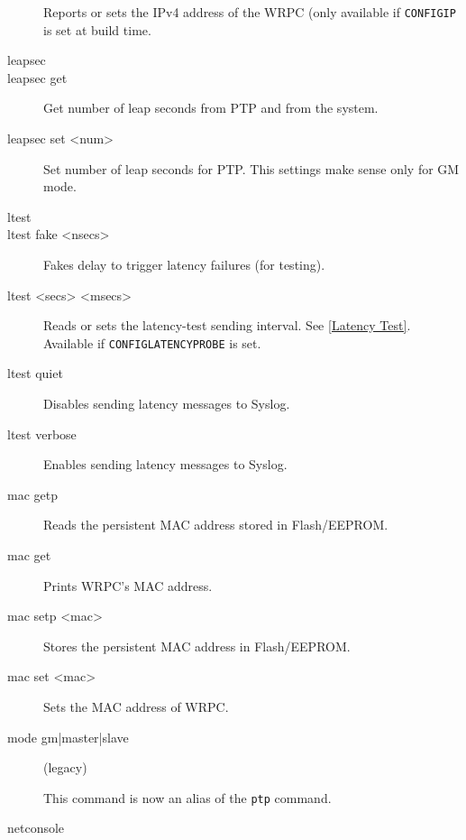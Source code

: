 \documentclass[a4paper, 12pt]{article}
\renewcommand{\_}{\underscore\allowbreak}
\begin{document}
\begin{description}
  Reports or sets the IPv4 address of the WRPC (only available if
  \texttt{CONFIG\_IP} is set at build time.

\item[leapsec]
\item[leapsec get] \mbox{}

  Get number of leap seconds from PTP and from the system.

\item[leapsec set <num>] \mbox{}

  Set number of leap seconds for PTP. This settings make sense only
  for GM mode.

\item[ltest]
\item[ltest fake <nsecs>] \mbox{}

  Fakes delay to trigger latency failures (for testing).

\item[ltest <secs> <msecs>] \mbox{}

  Reads or sets the latency-test sending interval. See \ref{Latency Test}.
  Available if \texttt{CONFIG\_LATENCY\_PROBE} is set.

\item[ltest quiet] \mbox{}

  Disables sending latency messages to Syslog.

\item[ltest verbose] \mbox{}

  Enables sending latency messages to Syslog.

\item[mac getp] \mbox{}

  Reads the persistent MAC address stored in Flash/EEPROM.

\item[mac get] \mbox{}

  Prints WRPC's MAC address.

\item[mac setp <mac>] \mbox{}

  Stores the persistent MAC address in Flash/EEPROM.

\item[mac set <mac>] \mbox{}

  Sets the MAC address of WRPC.

\item[mode gm|master|slave] (legacy) \mbox{}

  This command is now an alias of the \texttt{ptp} command.

\item[netconsole] \mbox{}


\end{description}
\end{document}
